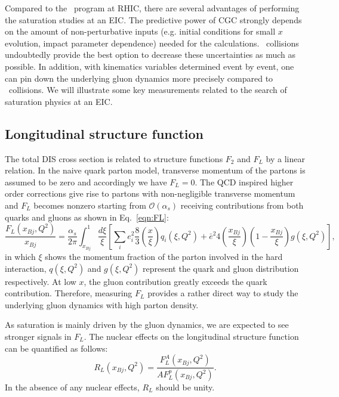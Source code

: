 Compared to the \dA\ program at RHIC, there are several advantages of performing
the saturation studies at an EIC. The predictive power of CGC strongly depends
on the amount of non-perturbative inputs (e.g. initial conditions for small $x$
evolution, impact parameter dependence) needed for the calculations. \eA\
collisions undoubtedly provide the best option to decrease these uncertainties
as much as possible. In addition, with kinematics variables determined event by
event, one can pin down the underlying gluon dynamics more precisely compared to
\dA\ collisions. We will illustrate some key measurements related to the
search of saturation physics at an EIC.

\subsection{Longitudinal structure function}
The total DIS cross section is related to structure functions $F_2$ and $F_L$ by
a linear relation. In the naive quark parton model, transverse momentum of the
partons is assumed to be zero and accordingly we have $F_{L}=0$. The QCD
inspired higher order corrections give rise to partons with non-negligible
transverse momentum and $F_{L}$ becomes nonzero starting from
$\mathcal{O}(\alpha_{s})$ receiving contributions from both quarks and gluons as
shown in Eq.~\ref{eqn:FL}:
\begin{equation}
\frac{F_{L}(x_{Bj},Q^{2})}{x_{Bj}}=\frac{\alpha_{s}}{2\pi}\int^{1}_{x_{Bj}}\frac{d\xi}{\xi}[\sum_{i}e^{2}_{i}\frac{8}{3}(\frac{x}{\xi})q_{i}(\xi,Q^{2})
+{\bar{e}}^{2}4(\frac{x_{Bj}}{\xi})(1-\frac{x_{Bj}}{\xi})g(\xi,Q^{2})], \label{eqn:FL}
\end{equation}
in which $\xi$ shows the momentum fraction of the parton involved in the hard interaction, $q(\xi,Q^{2})$ and
$g(\xi,Q^{2})$ represent the quark and gluon distribution respectively. 
At low $x$, the gluon contribution greatly exceeds the quark contribution. Therefore, measuring $F_{L}$ provides a rather direct
way to study the underlying gluon dynamics with high parton density.

As saturation is mainly driven by the gluon dynamics, we are expected to see
stronger signals in $F_L$. The nuclear effects on the longitudinal structure
function can be quantified as follows:
\begin{equation}
R_{L}(x_{Bj},Q^{2})=\frac{F^{A}_{L}(x_{Bj},Q^{2})}{AF^{p}_{L}(x_{Bj},Q^{2})}.
\end{equation}
In the absence of any nuclear effects, $R_L$ should be unity. 

